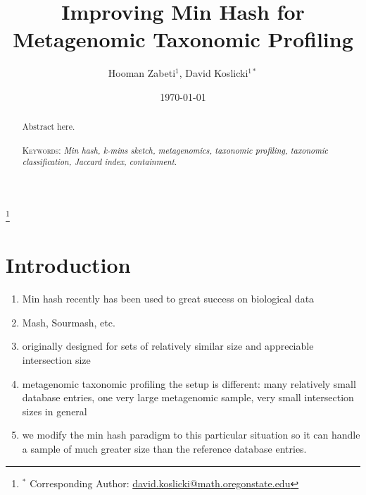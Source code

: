 \documentclass[11pt]{amsart}
\theoremstyle{remark}
\numberwithin{equation}{section}
\begin{document}
\title[Improving Min Hash]{Improving Min Hash for Metagenomic Taxonomic Profiling} %


\author{Hooman Zabeti${}^{1}$, David Koslicki${}^{1*}$}
\address{${}^1$ Mathematics Department, Oregon State University, Corvallis, OR.}
\thanks{${}^*$ Corresponding Author: \url{david.koslicki@math.oregonstate.edu}}





\date{\today}
\begin{abstract}
Abstract here.  \\\\
\smallskip
\noindent \textsc{Keywords}: \emph{Min hash, k-mins sketch, metagenomics, taxonomic profiling, taxonomic classification, Jaccard index, containment}.
\end{abstract}
\maketitle


\section{Introduction}
\begin{enumerate}
\item Min hash recently has been used to great success on biological data
\item Mash, Sourmash, etc.
\item originally designed for sets of relatively similar size and appreciable intersection size
\item metagenomic taxonomic profiling the setup is different: many relatively small database entries, one very large metagenomic sample, very small intersection sizes in general
\item we modify the min hash paradigm to this particular situation so it can handle a sample of much greater size than the reference database entries.
\end{enumerate}
\end{document}
